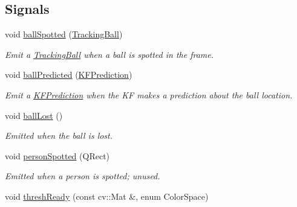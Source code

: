 \subsection*{Signals}
\begin{DoxyCompactItemize}
\item 
void \hyperlink{classKFBallTracker_a0a659913d1fea7bb0b3d259dada94a34}{ball\+Spotted} (\hyperlink{classTrackingBall}{Tracking\+Ball})\hypertarget{classKFBallTracker_a0a659913d1fea7bb0b3d259dada94a34}{}\label{classKFBallTracker_a0a659913d1fea7bb0b3d259dada94a34}

\begin{DoxyCompactList}\small\item\em Emit a \hyperlink{classTrackingBall}{Tracking\+Ball} when a ball is spotted in the frame. \end{DoxyCompactList}\item 
void \hyperlink{classKFBallTracker_a839734e346533f4b8a2abd9896b6cffb}{ball\+Predicted} (\hyperlink{classKFPrediction}{K\+F\+Prediction})\hypertarget{classKFBallTracker_a839734e346533f4b8a2abd9896b6cffb}{}\label{classKFBallTracker_a839734e346533f4b8a2abd9896b6cffb}

\begin{DoxyCompactList}\small\item\em Emit a \hyperlink{classKFPrediction}{K\+F\+Prediction} when the KF makes a prediction about the ball location. \end{DoxyCompactList}\item 
void \hyperlink{classKFBallTracker_a7279927e398fe5aa9557614f15d218aa}{ball\+Lost} ()\hypertarget{classKFBallTracker_a7279927e398fe5aa9557614f15d218aa}{}\label{classKFBallTracker_a7279927e398fe5aa9557614f15d218aa}

\begin{DoxyCompactList}\small\item\em Emitted when the ball is lost. \end{DoxyCompactList}\item 
void \hyperlink{classKFBallTracker_a6d10b62b8dc9dd5b2d5a96f330acaa93}{person\+Spotted} (Q\+Rect)\hypertarget{classKFBallTracker_a6d10b62b8dc9dd5b2d5a96f330acaa93}{}\label{classKFBallTracker_a6d10b62b8dc9dd5b2d5a96f330acaa93}

\begin{DoxyCompactList}\small\item\em Emitted when a person is spotted; unused. \end{DoxyCompactList}\item 
void \hyperlink{classKFBallTracker_a55de1a7379b9eed4c89ac6474ce7a4ac}{thresh\+Ready} (const cv\+::\+Mat \&, enum Color\+Space)\hypertarget{classKFBallTracker_a55de1a7379b9eed4c89ac6474ce7a4ac}{}\label{classKFBallTracker_a55de1a7379b9eed4c89ac6474ce7a4ac}


\end{DoxyCompactItemize}
